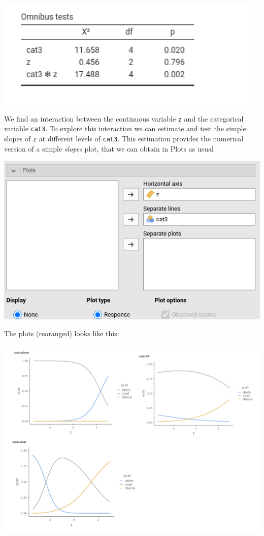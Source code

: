 \documentclass[
]{book}
\begin{document}
\includegraphics[width=5.01in]{bookletpics/3_multi_output8}

We find an interaction between the continuous variable \texttt{z} and the categorical variable \texttt{cat3}. To explore this interaction we can estimate and test the simple slopes of \texttt{z} at different levels of \texttt{cat3}. This estimation provides the numerical version of a simple \emph{slopes} plot, that we can obtain in {Plots} as usual

\includegraphics[width=7.71in]{bookletpics/3_multi_input2}

The plots (rearanged) looks like this:

\includegraphics[width=8.36in]{bookletpics/3_multi_output9}
\end{document}
